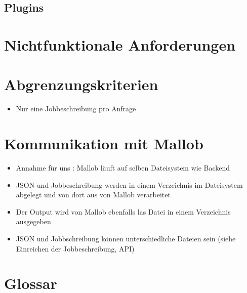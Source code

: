 \documentclass{article}
\begin{document}
\subsection{Plugins}
\section{Nichtfunktionale Anforderungen}


\section{Abgrenzungskriterien}
    \begin{itemize}
        \item Nur eine Jobbeschreibung pro Anfrage
    \end{itemize}
    
\section{Kommunikation mit Mallob}

\begin{itemize}
    \item Annahme für uns : Mallob läuft auf selben Dateisystem wie Backend 
    \item JSON und Jobbeschreibung werden in einem Verzeichnis im Dateisystem abgelegt und von dort aus von Mallob verarbeitet
    \item Der Output wird von Mallob ebenfalls las Datei in einem Verzeichnis ausgegeben
    \item JSON und Jobbschreibung können unterschiedliche Dateien sein (siehe Einreichen der Jobbeschreibung, API)
\end{itemize}










\section{Glossar}
\end{document}
